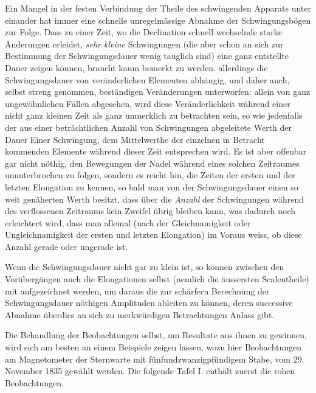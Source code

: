 \expandafter\def\csname HistoricalNoteText391\endcsname{Ein Mangel in der festen Verbindung der Theile des schwingenden Apparats unter einander hat immer eine schnelle unregelmässige Abnahme der Schwingungsbögen zur Folge.}
\expandafter\def\csname HistoricalNoteText382\endcsname{Dass zu einer Zeit, wo die Declination schnell wechselnde starke Änderungen erleidet, \textit{sehr kleine} Schwingungen (die aber schon an sich zur Bestimmung der Schwingungsdauer wenig tauglich sind) eine ganz entstellte Dauer zeigen können, braucht kaum bemerkt zu werden.}
allerdings die Schwingungsdauer von veränderlichen Elementen abhängig, und daher auch, selbst streng genommen, beständigen Veränderungen unterworfen: allein von ganz ungewöhnlichen Fällen abgesehen, wird diese Veränderlichkeit während einer nicht ganz kleinen Zeit als ganz unmerklich zu betrachten sein, so wie jedenfalls der aus einer beträchtlichen Anzahl von Schwingungen abgeleitete Werth der Dauer Einer Schwingung, dem Mittelwerthe der einzelnen in Betracht kommenden Elemente während dieser Zeit entsprechen wird. Es ist aber offenbar gar nicht nöthig, den Bewegungen der Nadel während eines solchen Zeitraumes ununterbrochen zu folgen, sondern es reicht hin, die Zeiten der ersten und der letzten Elongation zu kennen, so bald man von der Schwingungsdauer einen so weit genäherten Werth besitzt, dass über die \textit{Anzahl} der Schwingungen während des verflossenen Zeitraums kein Zweifel übrig bleiben kann, was dadurch noch erleichtert wird, dass man allemal (nach der Gleichnamigkeit oder Ungleichnamigkeit der ersten und letzten Elongation) im Voraus weiss, ob diese Anzahl gerade oder ungerade ist.

Wenn die Schwingungsdauer nicht gar zu klein ist, so können zwischen den Vorübergängen auch die Elongationen selbst (nemlich die äussersten Scalentheile) mit aufgezeichnet werden, um daraus die zur schärfern Berechnung der Schwingungsdauer nöthigen Amplituden ableiten zu können, deren successive Abnahme überdies an sich zu merkwürdigen Betrachtungen Anlass gibt.

Die Behandlung der Beobachtungen selbst, um Resultate aus ihnen zu gewinnen, wird sich am besten an einem Beispiele zeigen lassen, wozu hier Beobachtungen am Magnetometer der Sternwarte mit fünfundzwanzigpfündigem Stabe, vom 29. November 1835 gewählt werden. Die folgende Tafel I. enthält zuerst die rohen Beobachtungen.

